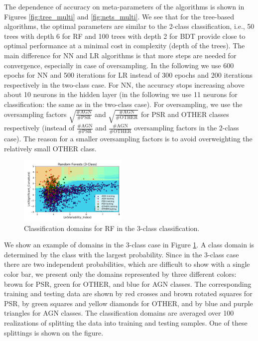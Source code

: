 The dependence of accuracy on meta-parameters of the algorithms is shown in Figures \ref{fig:tree_multi} and \ref{fig:nets_multi}.
We see that for the tree-based algorithms, the optimal parameters are similar to the 2-class classification, i.e., 50 trees with depth 6 for RF and 100 trees with depth 2 for BDT 
provide close to optimal performance at a minimal cost in complexity (depth of the trees).
The main difference for NN and LR algorithms is that more steps are needed for convergence, especially in case of oversampling. 
In the following we use 600 epochs for NN and 500 iterations for LR instead of 300 epochs and 200 iterations respectively in the two-class case.
For NN, the accuracy stops increasing above about 10 neurons in the hidden layer (in the following we use 11 neurons for classification: the same as in the two-class case).
For oversampling, we use the oversampling factors $\sqrt{\frac{\text{\# AGN}}{\text{\# PSR}}}$ and $\sqrt{\frac{\text{\# AGN}}{\text{\# OTHER}}}$ for PSR and OTHER classes respectively (instead of $\frac{\text{\# AGN}}{\text{\# PSR}}$ and $\frac{\text{\# AGN}}{\text{\# OTHER}}$ oversampling factors in the 2-class case).
The reason for a smaller oversampling factors is to avoid overweighting the relatively small OTHER class.

\begin{figure}[h]
\includegraphics[width=0.46\textwidth]{plots/classification_domains/rf_50_6_3class.pdf}
\caption{Classification domains for RF in the 3-class classification.
}
\label{fig:RF_domains_3class}
\end{figure}

We show an example of domains in the 3-class case in Figure \ref{fig:RF_domains_3class}.
A class domain is determined by the class with the largest probability.
Since in the 3-class case there are two independent probabilities, which are difficult to show with a single color bar,
we present only the domains represented by three different colors: brown for PSR, green for OTHER, and blue for AGN classes.
The corresponding training and testing data are shown by red crosses and brown rotated squares for PSR, by green squares and yellow diamonds for OTHER,
and by blue and purple triangles for AGN classes.
The classification domains are averaged over 100 realizations of splitting the data into training and testing samples.
One of these splittings is shown on the figure.


